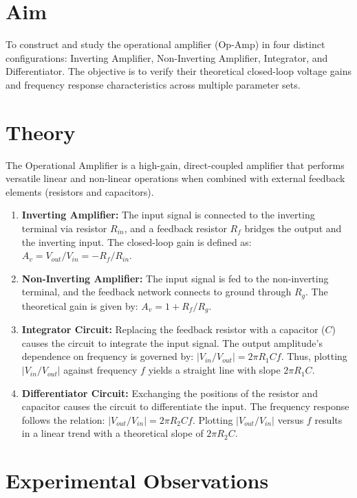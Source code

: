 \documentclass[../main.tex]{subfiles}
\begin{document}
\setcounter{page}{41}

\vspace*{1cm}
\section{Aim}
To construct and study the operational amplifier (Op-Amp) in four distinct configurations: Inverting Amplifier, Non-Inverting Amplifier, Integrator, and Differentiator. The objective is to verify their theoretical closed-loop voltage gains and frequency response characteristics across multiple parameter sets.

\section{Theory}
The Operational Amplifier is a high-gain, direct-coupled amplifier that performs versatile linear and non-linear operations when combined with external feedback elements (resistors and capacitors).
\begin{enumerate}
	\item \textbf{Inverting Amplifier:} The input signal is connected to the inverting terminal via resistor $R_{in}$, and a feedback resistor $R_f$ bridges the output and the inverting input. The closed-loop gain is defined as: $A_v = V_{out} / V_{in} = -R_f / R_{in}$.
	\item \textbf{Non-Inverting Amplifier:} The input signal is fed to the non-inverting terminal, and the feedback network connects to ground through $R_g$. The theoretical gain is given by: $A_v = 1 + R_f / R_g$.
	\item \textbf{Integrator Circuit:} Replacing the feedback resistor with a capacitor ($C$) causes the circuit to integrate the input signal. The output amplitude's dependence on frequency is governed by: $|V_{in}/V_{out}| = 2\pi R_1 C f$. Thus, plotting $|V_{in}/V_{out}|$ against frequency $f$ yields a straight line with slope $2\pi R_1 C$.
	\item \textbf{Differentiator Circuit:} Exchanging the positions of the resistor and capacitor causes the circuit to differentiate the input. The frequency response follows the relation: $|V_{out}/V_{in}| = 2\pi R_2 C f$. Plotting $|V_{out}/V_{in}|$ versus $f$ results in a linear trend with a theoretical slope of $2\pi R_2 C$.
\end{enumerate}

\section{Experimental Observations}

\end{document}
